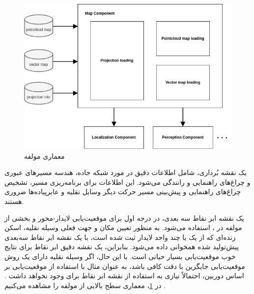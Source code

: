 \begin{figure}[h!]
    \centering
    \includegraphics[width=0.75\linewidth]{figures/Autoware_Map_Architecture.png}
    \caption{معماری مولفه  \cite{Autoware:Documentation}}
    \label{fig:Autoware_Map_Architecture}
\end{figure}

یک نقشه بُرداری، شامل اطلاعات دقیق در مورد شبکه جاده، هندسه مسیر‌های عبوری و چراغ‌های راهنمایی و رانندگی می‌شود. این اطلاعات برای برنامه‌ریزی مسیر، تشخیص چراغ‌های راهنمایی و پیش‌بینی مسیر حرکت دیگر وسایل نقلیه و عابر‌پیاده‌ها ضروری هستند.

یک نقشه ابر نقاط سه بعدی، در درجه اول برای موقعیت‌یابی لایدار-محور و بخشی از مولفه  در ، استفاده می‌شود. به منظور تعیین مکان و جهت فعلی وسیله نقلیه، اسکن زنده‌ای که از یک یا چند واحد لایدار ثبت شده است، با یک نقشه ابر نقاط سه‌بعدی پیش‌تولید شده همخوانی داده می‌شود. بنابراین، یک نقشه دقیق ابر نقاط برای نتایج خوب موقعیت‌یابی بسیار حیاتی است. با این حال، اگر وسیله نقلیه دارای یک روش موقعیت‌یابی جایگزین با دقت کافی باشد، به عنوان مثال با استفاده از موقعیت‌یابی بر اساس دوربین، احتمالاً نیازی به استفاده از نقشه ابر نقاط برای وجود نخواهد داشت \cite{Autoware:Documentation}. در \cref{fig:Autoware_Map_Architecture}، معماری‌ سطح‌ بالایی از مولفه  را مشاهده می‌کنیم  .

